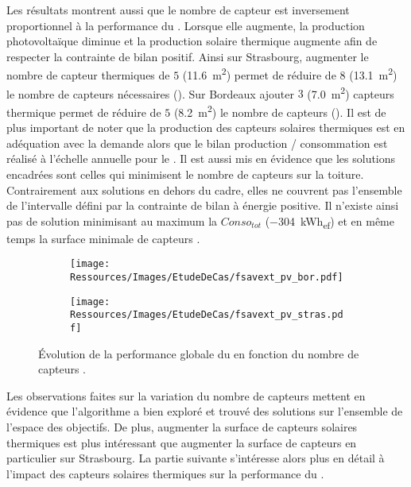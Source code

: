 Les résultats montrent aussi que le nombre de capteur  est inversement
proportionnel à la performance du . Lorsque elle augmente, la production
photovoltaïque diminue et la production solaire thermique augmente afin de respecter la
contrainte de bilan positif. Ainsi sur Strasbourg, augmenter le nombre de capteur
thermiques de $5$ (\SI{11.6}{m^{2}}) permet de réduire de $8$ (\SI{13.1}{m^{2}}) le nombre de capteurs  nécessaires
(). Sur Bordeaux ajouter $3$ (\SI{7.0}{m^{2}}) capteurs thermique permet
de réduire de $5$ (\SI{8.2}{m^{2}}) le nombre de capteurs  (). Il
est de plus important de noter que la production des capteurs solaires thermiques est en adéquation
avec la demande alors que le bilan production / consommation est réalisé à l’échelle annuelle
pour le . Il est aussi mis en évidence que les solutions encadrées sont celles qui
minimisent le nombre de capteurs  sur la toiture. Contrairement aux solutions en
dehors du cadre, elles ne couvrent pas l’ensemble de l’intervalle défini par la contrainte
de bilan à énergie positive. Il n’existe ainsi pas de solution minimisant au maximum la
$Conso_{tot}$ (\SI{-304}{kWh_{ef}}) et en même temps la surface minimale de capteurs
.

\begin{figure}
    \centering
    \begin{subfigure}[b]{0.48\textwidth}
        \centering
        \texttt{[image: Ressources/Images/EtudeDeCas/fsavext\_pv\_bor.pdf]}
        \caption{}
        \label{fig:fsav_pv_bor}
    \end{subfigure}
    \quad
    \begin{subfigure}[b]{0.48\textwidth}
        \centering
        \texttt{[image: Ressources/Images/EtudeDeCas/fsavext\_pv\_stras.pdf]}
        \caption{}
        \label{fig:fsav_pv_stras}
    \end{subfigure}
    \caption[Évolution de la performance globale du  en fonction du nombre de capteurs ]
             {Évolution de la performance globale du  en fonction du nombre de capteurs .}
    \label{fig:fsav_pv_bor_stras}
\end{figure}

Les observations faites sur la variation du nombre de capteurs 
mettent en évidence que l’algorithme a bien exploré et trouvé des solutions sur
l’ensemble de l’espace des objectifs. De plus, augmenter la surface de capteurs
solaires thermiques est plus intéressant que augmenter la surface de capteurs 
en particulier sur Strasbourg. La partie suivante s’intéresse alors plus en détail
à l’impact des capteurs solaires thermiques sur la performance du .

